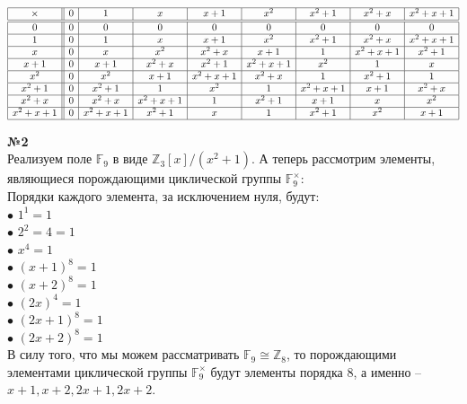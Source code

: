 \documentclass[a4paper, 12pt]{article}
\newcommand{\F}{\mathbb{F}}
\newcommand{\Z}{\mathbb{Z}}
\begin{document}
	\begin{addmargin}[-1.5em]{0em}
		$\begin{array}{|c||c|c|c|c|c|c|c|c|} \hline
			\times  & 0 & 1		  & x 		& x+1 	  & x^2 	& x^2+1   & x^2+x   & x^2+x+1 \\
			\hline
			\hline
			0       & 0 & 0		  & 0		& 0  	  & 0       & 0       & 0       & 0       \\
			\hline
			1       & 0 & 1		  & x       & x+1     & x^2     & x^2+1   & x^2+x   & x^2+x+1 \\
			\hline
			x       & 0 & x		  & x^2     & x^2+x   & x+1     & 1       & x^2+x+1 & x^2+1   \\
			\hline
			x+1     & 0 & x+1	  & x^2+x   & x^2+1   & x^2+x+1 & x^2     & 1       & x       \\
			\hline
			x^2     & 0 & x^2     & x+1     & x^2+x+1 & x^2+x   & 1       & x^2+1   & 1       \\
			\hline
			x^2+1   & 0 & x^2+1   & 1	    & x^2     & 1   	& x^2+x+1 & x+1     & x^2+x   \\
			\hline 
			x^2+x   & 0 & x^2+x   & x^2+x+1 & 1		  & x^2+1   & x+1     & x       & x^2     \\
			\hline 
			x^2+x+1 & 0 & x^2+x+1 & x^2+1   & x		  & 1		& x^2+1   & x^2     & x+1     \\
			\hline
		\end{array}$ \newpage
	\end{addmargin}

	
	\textbf{№2} \\
	
	Реализуем поле $\F_9$ в виде $\Z_3[x]/(x^2+1)$. А теперь рассмотрим элементы, являющиеся порождающими циклической группы $\F_9^{\times}$: \\
	Порядки каждого элемента, за исключением нуля, будут: \\
	$\bullet$ $1^1 = 1$ \\
	$\bullet$ $2^2 = 4 = 1$ \\
	$\bullet$ $x^4 = 1$ \\
	$\bullet$ $(x+1)^8 = 1$ \\
	$\bullet$ $(x+2)^8 = 1$ \\
	$\bullet$ $(2x)^4 = 1$ \\
	$\bullet$ $(2x+1)^8 = 1$ \\
	$\bullet$ $(2x+2)^8 = 1$ \\
	В силу того, что мы можем рассматривать $\F_9 \cong \Z_8$, то порождающими элементами циклической группы $\F_9^{\times}$ будут элементы порядка 8, а именно -- $x+1, x+2, 2x+1, 2x+2$. \\
	
\end{document}
